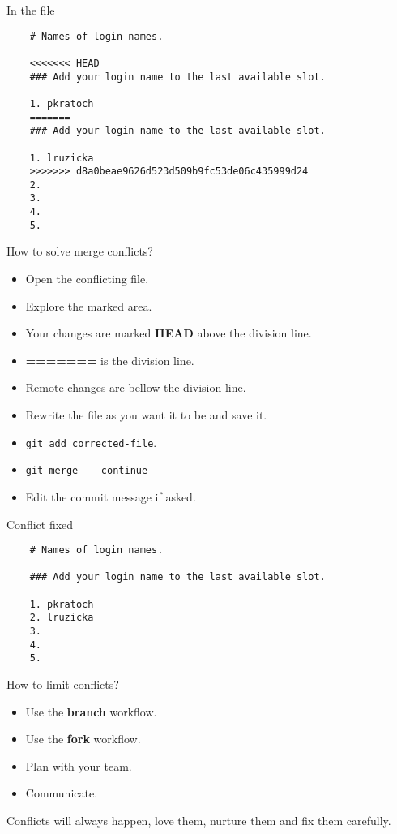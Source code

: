\documentclass[14pt]{beamer}
\begin{document}
	\begin{frame}[fragile]{In the file}
	\begin{verbatim}
	# Names of login names.
	
	<<<<<<< HEAD                                                                                                           
	### Add your login name to the last available slot.
	
	1. pkratoch
	=======
	### Add your login name to the last available slot.
	
	1. lruzicka
	>>>>>>> d8a0beae9626d523d509b9fc53de06c435999d24
	2.
	3.
	4.
	5.
	\end{verbatim}
	\end{frame}

\begin{frame}{How to solve merge conflicts?}
	\begin{itemize}
		\item Open the conflicting file.
		\item Explore the marked area.
		\item Your changes are marked \textbf{HEAD} above the division line.
		\item \textbf{=======} is the division line.
		\item Remote changes are bellow the division line.
		\item Rewrite the file as you want it to be and save it.
		\item \texttt{git add corrected-file}.
		\item \texttt{git merge -\,-continue}
		\item Edit the commit message if asked.
	\end{itemize}
\end{frame}

	\begin{frame}[fragile]{Conflict fixed}
	\begin{verbatim}
	# Names of login names.
	
	### Add your login name to the last available slot.
	
	1. pkratoch
	2. lruzicka
	3.
	4.
	5.
	\end{verbatim}
	\end{frame}


	\begin{frame}{How to limit conflicts?}
	\begin{itemize}
		\item Use the \textbf{branch} workflow.
		\item Use the \textbf{fork} workflow.
		\item Plan with your team.
		\item Communicate.
	\end{itemize}

	\vspace{5pt}

	Conflicts will always happen, love them, nurture them and fix them carefully.
\end{frame}
\end{document}
